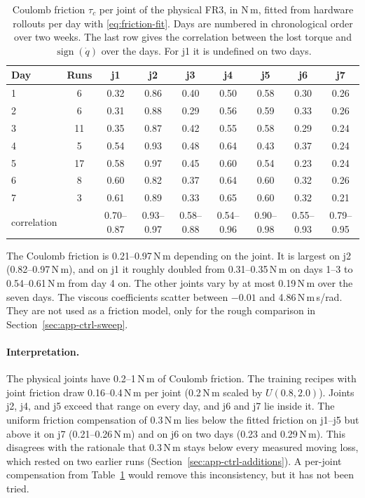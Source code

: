 \begin{table}[!htbp]%
    \centering%
    \caption[Joint Coulomb friction fitted from rollouts]{Coulomb friction $\tau_c$ per joint of the physical \ac{FR3}, in N\,m, fitted from hardware rollouts per day with \eqref{eq:friction-fit}. Days are numbered in chronological order over two weeks. The last row gives the correlation between the lost torque and $\operatorname{sign}(\dot{q})$ over the days. For j1 it is undefined on two days.}%
    \label{tab:ctrl-fit}%
    \small
    \setlength{\tabcolsep}{3pt}%
    \begin{tabular}{lcccccccc}
        \toprule
        Day & Runs & j1 & j2 & j3 & j4 & j5 & j6 & j7 \\
        \midrule
        1 & 6 & 0.32 & 0.86 & 0.40 & 0.50 & 0.58 & 0.30 & 0.26 \\
        2 & 6 & 0.31 & 0.88 & 0.29 & 0.56 & 0.59 & 0.33 & 0.26 \\
        3 & 11 & 0.35 & 0.87 & 0.42 & 0.55 & 0.58 & 0.29 & 0.24 \\
        4 & 5 & 0.54 & 0.93 & 0.48 & 0.64 & 0.43 & 0.37 & 0.24 \\
        5 & 17 & 0.58 & 0.97 & 0.45 & 0.60 & 0.54 & 0.23 & 0.24 \\
        6 & 8 & 0.60 & 0.82 & 0.37 & 0.64 & 0.60 & 0.32 & 0.26 \\
        7 & 3 & 0.61 & 0.89 & 0.33 & 0.65 & 0.60 & 0.32 & 0.21 \\
        \midrule
        correlation & & 0.70--0.87 & 0.93--0.97 & 0.58--0.88 & 0.54--0.96 & 0.90--0.98 & 0.55--0.93 & 0.79--0.95 \\
        \bottomrule
    \end{tabular}
\end{table}%

The Coulomb friction is 0.21--0.97\,N\,m depending on the joint. It is largest on j2 (0.82--0.97\,N\,m), and on j1 it roughly doubled from 0.31--0.35\,N\,m on days 1--3 to 0.54--0.61\,N\,m from day 4 on. The other joints vary by at most 0.19\,N\,m over the seven days. The viscous coefficients scatter between $-0.01$ and 4.86\,N\,m\,s/rad. They are not used as a friction model, only for the rough comparison in Section~\ref{sec:app-ctrl-sweep}.

\paragraph{Interpretation.} The physical joints have 0.2--1\,N\,m of Coulomb friction. The training recipes with joint friction draw 0.16--0.4\,N\,m per joint (0.2\,N\,m scaled by $U(0.8,2.0)$). Joints j2, j4, and j5 exceed that range on every day, and j6 and j7 lie inside it. The uniform friction compensation of 0.3\,N\,m lies below the fitted friction on j1--j5 but above it on j7 (0.21--0.26\,N\,m) and on j6 on two days (0.23 and 0.29\,N\,m). This disagrees with the rationale that 0.3\,N\,m stays below every measured moving loss, which rested on two earlier runs (Section~\ref{sec:app-ctrl-additions}). A per-joint compensation from Table~\ref{tab:ctrl-fit} would remove this inconsistency, but it has not been tried.

